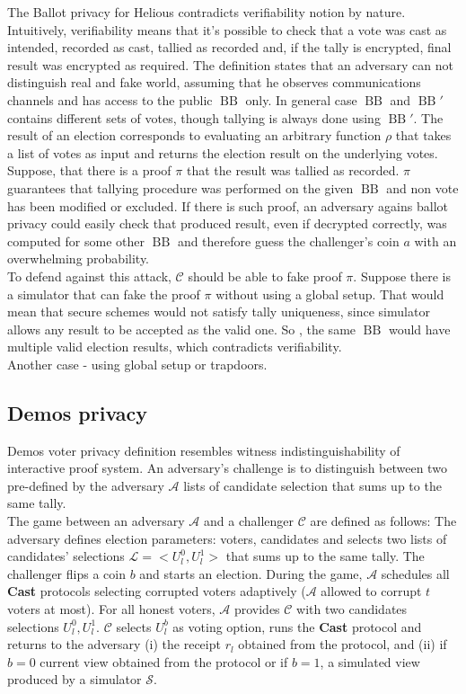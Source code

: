 \documentclass[12pt]{article}
\DeclareMathOperator{\bb}{BB}
\begin{document}
The Ballot privacy for Helious contradicts verifiability notion by nature. Intuitively, verifiability means that it's possible to check that a vote was cast as intended, recorded as cast, tallied as recorded and, if the tally is encrypted, final result was encrypted as required. The definition states that an adversary can not distinguish real and fake world, assuming that he observes communications channels and has access to the public $\bb$ only. In general case $\bb$ and $\bb'$ contains different sets of votes, though tallying is always done using $\bb'$. The result of an election corresponds to evaluating an arbitrary function $\rho$ that takes a list of votes as input and returns the election result on the underlying votes. Suppose, that there is a proof $\pi$ that the result was tallied as recorded. $\pi$ guarantees that tallying procedure was performed on the given $\bb$ and non vote has been modified or excluded. If there is such proof, an adversary agains ballot privacy could easily check that produced result, even if decrypted correctly, was computed for some other $\bb$ and therefore guess the challenger's coin $a$ with an overwhelming probability. \\

To defend against this attack, $\mathcal{C}$ should be able to fake proof $\pi$. Suppose there is a simulator that can fake the proof $\pi$ without using a global setup. That would mean that secure schemes would not satisfy tally uniqueness, since simulator allows any result to be accepted as the valid one. So , the same $\bb$ would have multiple valid election results, which contradicts verifiability. \\ 

Another case - using global setup or trapdoors. 

 \subsection{Demos privacy}
 Demos voter privacy definition resembles witness indistinguishability of interactive proof system. An adversary's challenge is to distinguish between two pre-defined by the adversary  $\mathcal{A}$ lists of candidate selection that sums up to the same tally. \\
 
 The game between an adversary $\mathcal{A}$ and a challenger $\mathcal{C}$ are defined as follows: The adversary defines election parameters: voters, candidates and selects two lists of candidates' selections $\mathcal{L} = <U_l^0, U_l^1>$  that sums up to the same tally. The challenger flips a coin $b$ and starts an election. During the game,   $\mathcal{A}$ schedules all \textbf{Cast} protocols selecting corrupted voters adaptively ($\mathcal{A}$ allowed to corrupt $t$ voters at most). For all honest voters,  $\mathcal{A}$ provides $\mathcal{C}$ with two candidates selections $U_l^0, U_l^1$. $\mathcal{C}$ selects $U_l^b$ as voting option, runs the \textbf{Cast}  protocol and returns to the adversary (i) the receipt $r_l$ obtained from the protocol, and (ii) if $b = 0$ current view obtained from the protocol or if $b =1$, a simulated view produced by a simulator $\mathcal{S}$. \\
 
\end{document}
